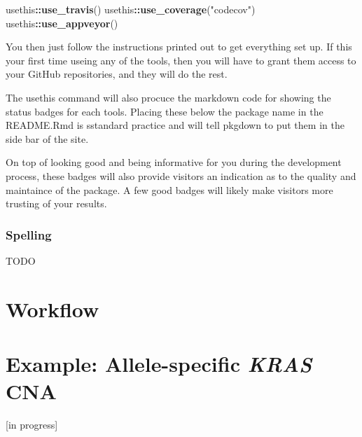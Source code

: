 \documentclass[]{book}
\newenvironment{Shaded}{\begin{snugshade}}{\end{snugshade}}
\newcommand{\KeywordTok}[1]{\textcolor[rgb]{0.13,0.29,0.53}{\textbf{#1}}}
\newcommand{\NormalTok}[1]{#1}
\newcommand{\OperatorTok}[1]{\textcolor[rgb]{0.81,0.36,0.00}{\textbf{#1}}}
\newcommand{\StringTok}[1]{\textcolor[rgb]{0.31,0.60,0.02}{#1}}
\begin{document}
\begin{Shaded}
\begin{Highlighting}[]
\NormalTok{usethis}\OperatorTok{::}\KeywordTok{use_travis}\NormalTok{()}
\NormalTok{usethis}\OperatorTok{::}\KeywordTok{use_coverage}\NormalTok{(}\StringTok{"codecov"}\NormalTok{)}
\NormalTok{usethis}\OperatorTok{::}\KeywordTok{use_appveyor}\NormalTok{()}
\end{Highlighting}
\end{Shaded}

You then just follow the instructions printed out to get everything set up. If this your first time useing any of the tools, then you will have to grant them access to your GitHub repositories, and they will do the rest.

The usethis command will also procuce the markdown code for showing the status badges for each tools. Placing these below the package name in the README.Rmd is sstandard practice and will tell pkgdown to put them in the side bar of the site.

On top of looking good and being informative for you during the development process, these badges will also provide visitors an indication as to the quality and maintaince of the package. A few good badges will likely make visitors more trusting of your results.

\hypertarget{spelling}{%
\subsection{Spelling}\label{spelling}}

TODO

\hypertarget{workflow}{%
\chapter{Workflow}\label{workflow}}

\hypertarget{example-allele-specific-kras-cna}{%
\chapter{\texorpdfstring{Example: Allele-specific \emph{KRAS} CNA}{Example: Allele-specific KRAS CNA}}\label{example-allele-specific-kras-cna}}

{[}in progress{]}


\end{document}
